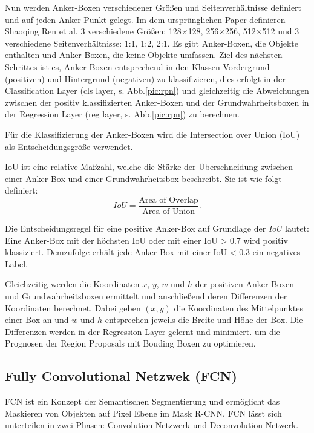 Nun werden Anker-Boxen verschiedener Größen und Seitenverhältnisse definiert und auf jeden Anker-Punkt gelegt. Im dem ursprünglichen Paper \cite{9} definieren Shaoqing Ren et al. 3 verschiedene Größen: 128$\times$128, 256$\times$256, 512$\times$512 und 3 verschiedene Seitenverhältnisse: 1:1, 1:2, 2:1. Es gibt Anker-Boxen, die Objekte enthalten und Anker-Boxen, die keine Objekte umfassen. Ziel des nächsten Schrittes ist es, Anker-Boxen entsprechend in den Klassen Vordergrund (positiven) und Hintergrund (negativen) zu klassifizieren, dies erfolgt in der Classification Layer (cls layer, s. Abb.\ref{pic:rpn}) und gleichzeitig die Abweichungen zwischen der positiv klassifizierten Anker-Boxen und der Grundwahrheitsboxen in der Regression Layer (reg layer, s. Abb.\ref{pic:rpn}) zu berechnen.

Für die Klassifizierung der Anker-Boxen wird die Intersection over Union (IoU) als Entscheidungsgröße verwendet. 
\begin{Definition}[IoU]
IoU ist eine relative Maßzahl, welche die Stärke der Überschneidung zwischen einer Anker-Box und einer Grundwahrheitsbox beschreibt. Sie ist wie folgt definiert:
\begin{equation}
IoU = \frac{\textrm{Area of Overlap}}{\textrm{Area of Union}}. \label{IoU}  
\end{equation}
\end{Definition}
Die Entscheidungsregel für eine positive Anker-Box auf Grundlage der $IoU$ lautet: Eine Anker-Box mit der höchsten IoU oder mit einer IoU > 0.7 wird positiv klassiziert. Demzufolge erhält jede Anker-Box mit einer IoU < 0.3 ein negatives Label.

Gleichzeitig werden die Koordinaten $x$, $y$, $w$ und $h$ der positiven Anker-Boxen und Grundwahrheitsboxen ermittelt und anschließend deren Differenzen der Koordinaten berechnet. Dabei geben $(x,y)$ die Koordinaten des Mittelpunktes einer Box an und $w$ und $h$ entsprechen jeweils die Breite und Höhe der Box. Die Differenzen werden in der Regression Layer gelernt und minimiert. um die Prognosen der Region Proposals mit Bouding Boxen zu optimieren.

\subsection{Fully Convolutional Netzwek (FCN)} \label{subsec:FCN}
FCN ist ein Konzept der Semantischen Segmentierung und ermöglicht das Maskieren von Objekten auf Pixel Ebene im Mask R-CNN. FCN lässt sich unterteilen in zwei Phasen: Convolution Netzwerk und Deconvolution Netwerk. 

